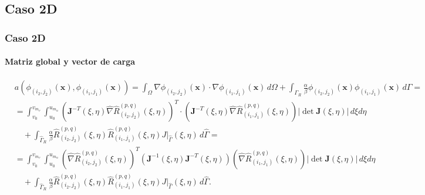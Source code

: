 \documentclass[compress]{beamer}
\begin{document}
\subsection{Caso 2D}
\begin{frame}
	\frametitle{Caso 2D}
	\framesubtitle{Matriz global y vector de carga}

	\tiny
	\vspace{-5pt}
	\begin{definition}

				\vspace{-10pt}
		\begin{align*}
			&a(\phi_{(i_2,j_2)}(\mathbf{x}),\phi_{(i_1,j_1)}(\mathbf{x})) = \int_{\Omega}\nabla \phi_{(i_2,j_2)}(\mathbf{x}) \cdot \nabla \phi_{(i_1,j_1)}(\mathbf{x}) \, d\Omega \nonumber + \int_{\Gamma_R}\frac{\alpha}{\beta}\phi_{(i_2,j_2)}(\mathbf{x})\phi_{(i_1,j_1)}(\mathbf{x}) \, d\Gamma =\\[5pt]
			&= \int_{v_0}^{v_{m_v}}\int_{u_0}^{u_{m_u}} \left( \mathbf{J}^{-T}(\xi,\eta) \hat{\nabla} \hat{R}_{(i_2,j_2)}^{(p,q)}(\xi,\eta) \right)^T \cdot \left( \mathbf{J}^{-T}(\xi,\eta) \hat{\nabla} \hat{R}_{(i_1,j_1)}^{(p,q)}(\xi,\eta) \right) |\det \mathbf{J}(\xi,\eta)| \, d\xi d\eta \nonumber \\
			&\quad + \int_{\hat{\Gamma}_R}\frac{\alpha}{\beta}\hat{R}_{(i_2,j_2)}^{(p,q)}(\xi,\eta)\hat{R}_{(i_1,j_1)}^{(p,q)}(\xi,\eta) J|_{\hat{\Gamma}}(\xi,\eta) \, d\hat{\Gamma} =\\[5pt]
			&= \int_{v_0}^{v_{m_v}}\int_{u_0}^{u_{m_u}} \left(\hat{\nabla}\hat{R}_{(i_2,j_2)}^{(p,q)}(\xi,\eta)\right)^T \left( \mathbf{J}^{-1}(\xi,\eta) \mathbf{J}^{-T}(\xi,\eta) \right) \left(\hat{\nabla}\hat{R}_{(i_1,j_1)}^{(p,q)}(\xi,\eta)\right) |\det \mathbf{J}(\xi,\eta)| \, d\xi d\eta \nonumber \\
			&\quad + \int_{\hat{\Gamma}_R}\frac{\alpha}{\beta}\hat{R}_{(i_2,j_2)}^{(p,q)}(\xi,\eta)\hat{R}_{(i_1,j_1)}^{(p,q)}(\xi,\eta) J|_{\hat{\Gamma}}(\xi,\eta) \, d\hat{\Gamma}.
		\end{align*}
	\end{definition}

	\vspace{-4pt}
	\begin{definition}


\end{definition}
\end{frame}
\end{document}
